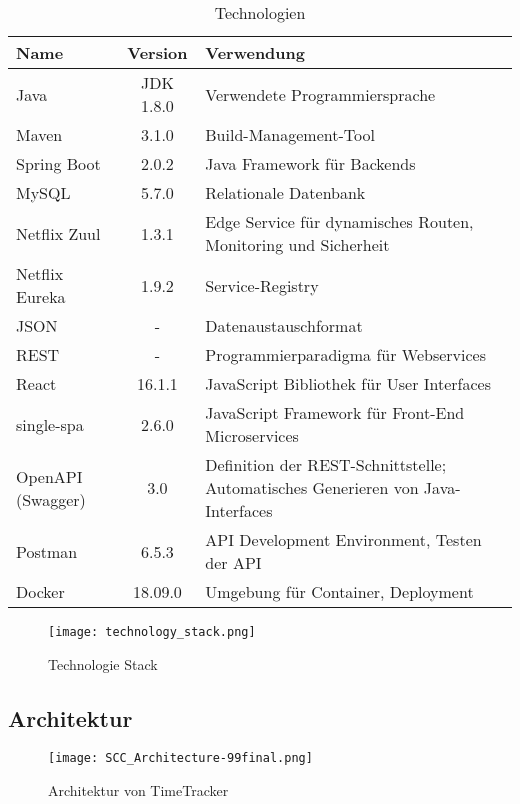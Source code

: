\renewcommand{\arraystretch}{1.3} %
\begin{table}[H] 
	\centering
	\caption{Technologien}
	\begin{tabularx}{\textwidth}{l|c|X}
		\textbf{Name} & \textbf{Version} & \textbf{Verwendung} \\
		\hline
		Java & JDK 1.8.0 & Verwendete Programmiersprache \\
		Maven & 3.1.0  & Build-Management-Tool \\
		Spring Boot & 2.0.2 & Java Framework für Backends \\
		MySQL & 5.7.0 & Relationale Datenbank \\
		Netflix Zuul & 1.3.1 & Edge Service für dynamisches Routen, \newline Monitoring und Sicherheit  \\
		Netflix Eureka & 1.9.2 &  Service-Registry   \\
		JSON & - & Datenaustauschformat \\
		REST & - & Programmierparadigma für Webservices \\
		React & 16.1.1 & JavaScript Bibliothek für User Interfaces  \\
		single-spa & 2.6.0 & JavaScript Framework für Front-End Microservices \\
		OpenAPI  (Swagger) & 3.0 & Definition der REST-Schnittstelle; Automatisches Generieren von Java-Interfaces  \\
		Postman & 6.5.3 & API Development Environment, \newline Testen der API \\
		Docker & 18.09.0 & Umgebung für Container, Deployment \\
	\end{tabularx}
	\label{tab:Technologien}
\end{table}

\begin{figure}[H]
	\hspace{-1.5cm}
	\texttt{[image: technology\_stack.png]}
	\caption{Technologie Stack}
	\label{fig:TechStack}
\end{figure}

\subsection{Architektur}


\begin{figure}[H]
	\hspace{-1.5cm}
	\texttt{[image: SCC\_Architecture-99final.png]}
	\caption{Architektur von TimeTracker}
	\label{fig:Architektur}
\end{figure}



